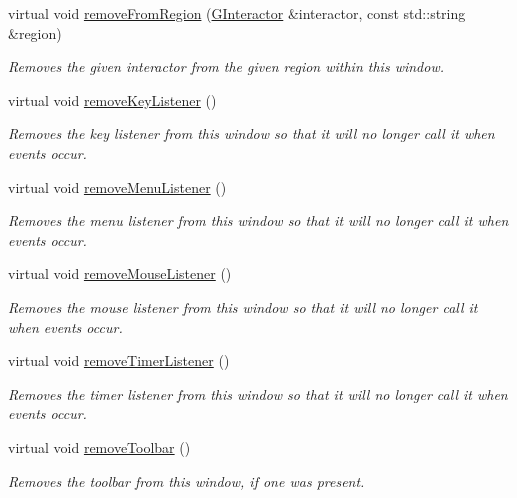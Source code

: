 \begin{DoxyCompactItemize}
virtual void \mbox{\hyperlink{classsgl_1_1GWindow_af7a055c83c0e0e3f3722596d7111fcbe}{remove\+From\+Region}} (\mbox{\hyperlink{classsgl_1_1GInteractor}{G\+Interactor}} \&interactor, const std\+::string \&region)
\begin{DoxyCompactList}\small\item\em Removes the given interactor from the given region within this window. \end{DoxyCompactList}\item 
virtual void \mbox{\hyperlink{classsgl_1_1GWindow_a43095f41cab3be732b49f29970484b05}{remove\+Key\+Listener}} ()
\begin{DoxyCompactList}\small\item\em Removes the key listener from this window so that it will no longer call it when events occur. \end{DoxyCompactList}\item 
virtual void \mbox{\hyperlink{classsgl_1_1GWindow_a718d186fa807d6dec721c3b6f0c4309a}{remove\+Menu\+Listener}} ()
\begin{DoxyCompactList}\small\item\em Removes the menu listener from this window so that it will no longer call it when events occur. \end{DoxyCompactList}\item 
virtual void \mbox{\hyperlink{classsgl_1_1GWindow_aff47f71ce47e688a07c9d38dc92fcc11}{remove\+Mouse\+Listener}} ()
\begin{DoxyCompactList}\small\item\em Removes the mouse listener from this window so that it will no longer call it when events occur. \end{DoxyCompactList}\item 
virtual void \mbox{\hyperlink{classsgl_1_1GWindow_a8ca9bf0f8dfd3755d73d07ee01e3455f}{remove\+Timer\+Listener}} ()
\begin{DoxyCompactList}\small\item\em Removes the timer listener from this window so that it will no longer call it when events occur. \end{DoxyCompactList}\item 
virtual void \mbox{\hyperlink{classsgl_1_1GWindow_a3d1c6ae17962b89115a4bf1c2f6142eb}{remove\+Toolbar}} ()
\begin{DoxyCompactList}\small\item\em Removes the toolbar from this window, if one was present. \end{DoxyCompactList}\item 

\end{DoxyCompactItemize}
